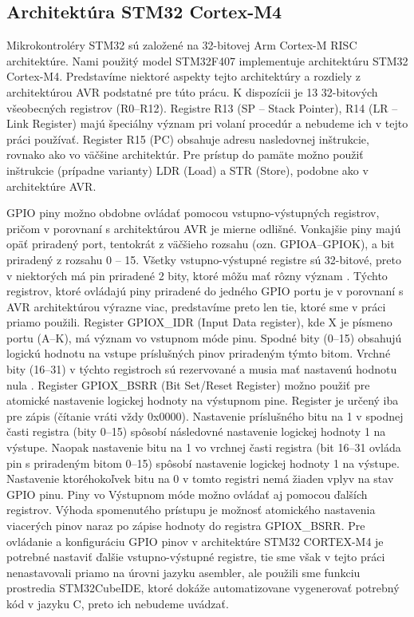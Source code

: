 \subsection{Architektúra STM32 Cortex-M4}
Mikrokontroléry STM32 sú založené na 32-bitovej Arm Cortex-M RISC architektúre. Nami použitý model STM32F407 implementuje architektúru STM32 Cortex-M4. Predstavíme niektoré aspekty tejto architektúry a rozdiely z architektúrou AVR podstatné pre túto prácu. K dispozícii je 13 32-bitových všeobecných registrov (R0--R12). Registre R13 (SP -- Stack Pointer), R14 (LR -- Link Register) majú špeciálny význam pri volaní procedúr \cite{stmInstruction} a nebudeme ich v tejto práci používať. Register R15 (PC) obsahuje adresu nasledovnej inštrukcie, rovnako ako vo väčšine architektúr. Pre prístup do pamäte možno použiť inštrukcie (prípadne varianty) LDR (Load) a STR (Store), podobne ako v architektúre AVR.

GPIO piny možno obdobne ovládať pomocou vstupno-výstupných registrov, pričom v porovnaní s architektúrou AVR je mierne odlišné. Vonkajšie piny majú opäť priradený port, tentokrát z väčšieho rozsahu (ozn. GPIOA--GPIOK), a bit priradený z rozsahu 0 -- 15. Všetky vstupno-výstupné registre sú 32-bitové, preto v niektorých má pin priradené 2 bity, ktoré môžu mať rôzny význam \cite{stmReference}. Týchto registrov, ktoré ovládajú piny priradené do jedného GPIO portu je v porovnaní s AVR architektúrou výrazne viac, predstavíme preto len tie, ktoré sme v práci priamo použili. Register GPIOX\_IDR (Input Data register), kde X je písmeno portu (A--K), má význam vo vstupnom móde pinu. Spodné bity (0--15) obsahujú logickú hodnotu na vstupe príslušných pinov priradeným týmto bitom. Vrchné bity (16--31) v týchto registroch sú rezervované a musia mať nastavenú hodnotu nula \cite{stmReference}. Register GPIOX\_BSRR (Bit Set/Reset Register) možno použiť pre atomické nastavenie logickej hodnoty na výstupnom pine. Register je určený iba pre zápis (čítanie vráti vždy 0x0000). Nastavenie príslušného bitu na 1 v spodnej časti registra (bity 0--15) spôsobí následovné nastavenie logickej hodnoty 1 na výstupe. Naopak nastavenie bitu na 1 vo vrchnej časti registra (bit 16--31 ovláda pin s priradeným bitom 0--15) spôsobí nastavenie logickej hodnoty 1 na výstupe. Nastavenie ktoréhokoľvek bitu na 0 v tomto registri nemá žiaden vplyv na stav GPIO pinu. Piny vo Výstupnom móde možno ovládať aj pomocou ďalších registrov. Výhoda spomenutého prístupu je možnosť atomického nastavenia viacerých pinov naraz po zápise hodnoty do registra GPIOX\_BSRR. Pre ovládanie a konfiguráciu GPIO pinov v architektúre STM32 CORTEX-M4 je potrebné nastaviť ďalšie vstupno-výstupné registre, tie sme však v tejto práci nenastavovali priamo na úrovni jazyku asembler, ale použili sme funkciu prostredia STM32CubeIDE, ktoré dokáže automatizovane vygenerovať potrebný kód v jazyku C, preto ich nebudeme uvádzať.

